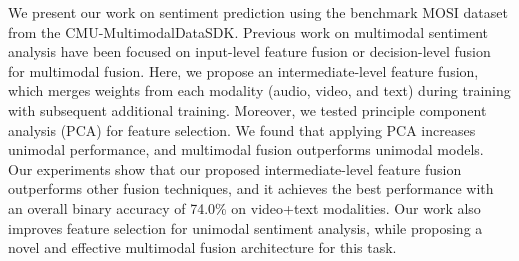 We present our work on sentiment prediction using the benchmark MOSI dataset from the CMU-MultimodalDataSDK. Previous work on multimodal sentiment analysis have been focused on input-level feature fusion or decision-level fusion for multimodal fusion. Here, we propose an intermediate-level feature fusion, which merges weights from each modality (audio, video, and text) during training with subsequent additional training. Moreover, we tested principle component analysis (PCA) for feature selection. We found that applying PCA increases unimodal performance, and multimodal fusion outperforms unimodal models. Our experiments show that our proposed intermediate-level feature fusion outperforms other fusion techniques, and it achieves the best performance with an overall binary accuracy of 74.0\% on video+text modalities. Our work also improves feature selection for unimodal sentiment analysis, while proposing a novel and effective multimodal fusion architecture for this task.
